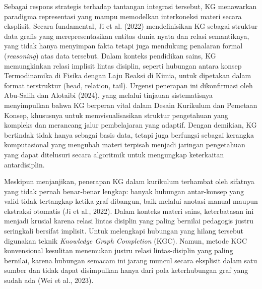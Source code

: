 \documentclass[
]{article}
\begin{document}
Sebagai respons strategis terhadap tantangan integrasi tersebut, KG
menawarkan paradigma representasi yang mampu memodelkan interkoneksi
materi secara eksplisit. Secara fundamental, Ji et al. (2022)
mendefinisikan KG sebagai struktur data grafis yang merepresentasikan
entitas dunia nyata dan relasi semantiknya, yang tidak hanya menyimpan
fakta tetapi juga mendukung penalaran formal (\emph{reasoning}) atas
data tersebut. Dalam konteks pendidikan sains, KG memungkinkan relasi
implisit lintas disiplin, seperti hubungan antara konsep Termodinamika
di Fisika dengan Laju Reaksi di Kimia, untuk dipetakan dalam format
terstruktur (head, relation, tail). Urgensi penerapan ini dikonfirmasi
oleh Abu-Salih dan Alotaibi (2024), yang melalui tinjauan sistematisnya
menyimpulkan bahwa KG berperan vital dalam Desain Kurikulum dan Pemetaan
Konsep, khususnya untuk memvisualisasikan struktur pengetahuan yang
kompleks dan merancang jalur pembelajaran yang adaptif. Dengan demikian,
KG bertindak tidak hanya sebagai basis data, tetapi juga berfungsi
sebagai kerangka komputasional yang mengubah materi terpisah menjadi
jaringan pengetahuan yang dapat ditelusuri secara algoritmik untuk
mengungkap keterkaitan antardisiplin.

Meskipun menjanjikan, penerapan KG dalam kurikulum terhambat oleh
sifatnya yang tidak pernah benar-benar lengkap: banyak hubungan
antar-konsep yang valid tidak tertangkap ketika graf dibangun, baik
melalui anotasi manual maupun ekstraksi otomatis (Ji et al., 2022).
Dalam konteks materi sains, keterbatasan ini menjadi krusial karena
relasi lintas disiplin yang paling bernilai pedagogis justru seringkali
bersifat implisit. Untuk melengkapi hubungan yang hilang tersebut
digunakan teknik \emph{Knowledge Graph Completion} (KGC). Namun, metode
KGC konvensional kesulitan menemukan justru relasi lintas-disiplin yang
paling bernilai, karena hubungan semacam ini jarang muncul secara
eksplisit dalam satu sumber dan tidak dapat disimpulkan hanya dari pola
keterhubungan graf yang sudah ada (Wei et al., 2023).
\end{document}
